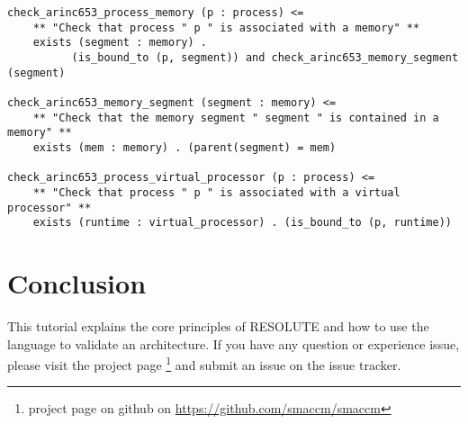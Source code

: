 \documentclass[times, 10pt]{article}
\begin{document}
\begin{lstlisting}
check_arinc653_process_memory (p : process) <=
	** "Check that process " p " is associated with a memory" **
	exists (segment : memory) . 
          (is_bound_to (p, segment)) and check_arinc653_memory_segment (segment)

check_arinc653_memory_segment (segment : memory) <=
	** "Check that the memory segment " segment " is contained in a memory" **
	exists (mem : memory) . (parent(segment) = mem)

check_arinc653_process_virtual_processor (p : process) <=
	** "Check that process " p " is associated with a virtual processor" **
	exists (runtime : virtual_processor) . (is_bound_to (p, runtime))		
\end{lstlisting}


\section{Conclusion}
This tutorial explains the core principles of RESOLUTE and how to use
the language to validate an architecture. If you have any question
or experience issue, please visit the project page 
\footnote{project page on github on \url{https://github.com/smaccm/smaccm}}
and submit an issue on the issue tracker.
\end{document}
